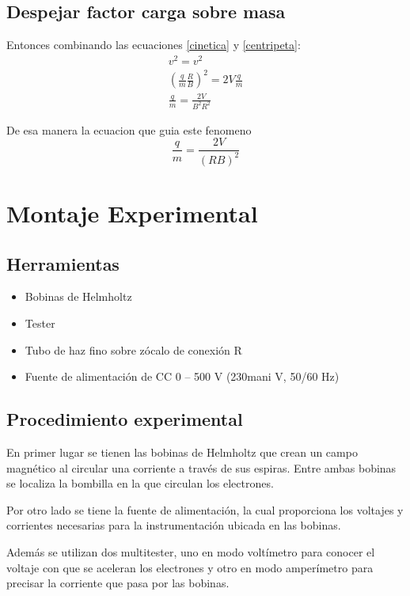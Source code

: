 \documentclass[a4paper,twocolumn,10pt]{article}
\begin{document}
\subsection{Despejar factor carga sobre masa}
Entonces combinando las ecuaciones \ref{cinetica} y \ref{centripeta}:
$$
\begin{array}{cc}
    v^2 = v^2  \\
      (\frac{q}{m} \frac{R}{B})^2 =  2V \frac{q}{m} \\
      \frac{q}{m} = \frac{2V}{B^2 R^2}
\end{array}
$$

De esa manera la ecuacion que guia este fenomeno
\begin{equation}
    \frac{q}{m} = \frac{2V}{(RB)^2}
\end{equation}\label{maineq}


\section{Montaje Experimental}
\subsection{Herramientas}
\begin{itemize} 
\item Bobinas de Helmholtz
\item Tester 
\item Tubo de haz fino sobre zócalo de conexión R
\item Fuente de alimentación de CC 0 – 500 V (230mani V, 50/60 Hz)
\end{itemize}

\subsection{Procedimiento experimental}

En primer lugar se tienen las bobinas de Helmholtz que crean un campo magnético al circular una corriente a través de sus espiras. Entre ambas bobinas se localiza la bombilla en la que circulan los electrones. 

Por otro lado se tiene la fuente de alimentación, la cual proporciona los voltajes y corrientes necesarias para la instrumentación ubicada en las bobinas.

Además se utilizan dos multitester, uno en modo voltímetro para conocer el voltaje con que se aceleran los electrones y otro en modo amperímetro para precisar la corriente que pasa por las bobinas.
\end{document}
